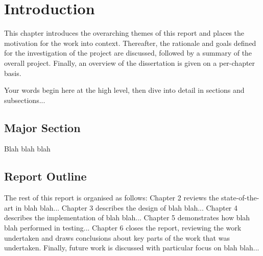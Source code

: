 \chapter{Introduction}


This chapter introduces the overarching themes of this report and places the motivation for the work into context. Thereafter, the rationale and goals defined for the investigation of the project are discussed, followed by a summary of the overall project. Finally, an overview of the dissertation is given on a per-chapter basis.

Your words begin here at the high level, then dive into detail in sections and subsections...

\section{Major Section}

Blah blah blah

\section{Report Outline}

The rest of this report is organised as follows:
Chapter 2 reviews the state-of-the-art in blah blah...
Chapter 3 describes the design of blah blah...
Chapter 4 describes the implementation of blah blah...
Chapter 5 demonstrates how blah blah performed in testing...
Chapter 6 closes the report, reviewing the work undertaken and draws conclusions about key parts of the work that was undertaken.  Finally, future work is discussed with particular focus on blah blah...